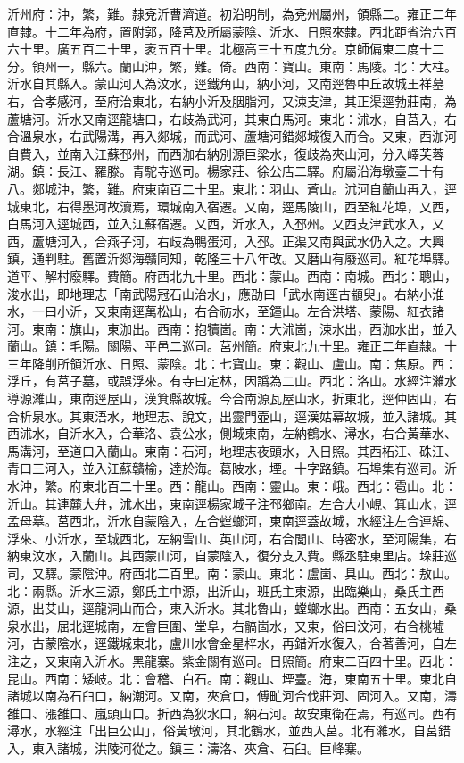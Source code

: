 \begin{pinyinscope}
沂州府：沖，繁，難。隸兗沂曹濟道。初沿明制，為兗州屬州，領縣二。雍正二年直隸。十二年為府，置附郭，降莒及所屬蒙陰、沂水、日照來隸。西北距省治六百六十里。廣五百二十里，袤五百十里。北極高三十五度九分。京師偏東二度十二分。領州一，縣六。蘭山沖，繁，難。倚。西南：寶山。東南：馬陵。北：大柱。沂水自其縣入。蒙山河入為汶水，逕鐵角山，納小河，又南逕魯中丘故城王祥墓右，合孝感河，至府治東北，右納小沂及胭脂河，又涑支津，其正渠逕勃莊南，為蘆塘河。沂水又南逕龍塘口，右歧為武河，其東白馬河。東北：沭水，自莒入，右合溫泉水，右武陽溝，再入郯城，而武河、蘆塘河錯郯城復入而合。又東，西泇河自費入，並南入江蘇邳州，而西泇右納別源巨梁水，復歧為夾山河，分入嶧芙蓉湖。鎮：長江、羅滕。青駝寺巡司。楊家莊、徐公店二驛。府屬沿海墩臺二十有八。郯城沖，繁，難。府東南百二十里。東北：羽山、蒼山。沭河自蘭山再入，逕城東北，右得墨河故瀆焉，環城南入宿遷。又南，逕馬陵山，西至紅花埠，又西，白馬河入逕城西，並入江蘇宿遷。又西，沂水入，入邳州。又西支津武水入，又西，蘆塘河入，合燕子河，右歧為鴨蛋河，入邳。正渠又南與武水仍入之。大興鎮，通判駐。舊置沂郯海贛同知，乾隆三十八年改。又磨山有廢巡司。紅花埠驛。道平、解村廢驛。費簡。府西北九十里。西北：蒙山。西南：南城。西北：聰山，浚水出，即地理志「南武陽冠石山治水」，應劭曰「武水南逕古顓臾」。右納小淮水，一曰小沂，又東南逕萬松山，右合祊水，至鐘山。左合洪塔、蒙陽、紅衣諸河。東南：旗山，東泇出。西南：抱犢崮。南：大沭崮，涑水出，西泇水出，並入蘭山。鎮：毛陽。關陽、平邑二巡司。莒州簡。府東北九十里。雍正二年直隸。十三年降削所領沂水、日照、蒙陰。北：七寶山。東：觀山、盧山。南：焦原。西：浮丘，有莒子墓，或誤浮來。有寺曰定林，因譌為二山。西北：洛山。水經注濰水導源濰山，東南逕屋山，漢箕縣故城。今合南源瓦屋山水，折東北，逕仲固山，右合析泉水。其東浯水，地理志、說文，出靈門壺山，逕漢姑幕故城，並入諸城。其西沭水，自沂水入，合華洛、袁公水，側城東南，左納鶴水、潯水，右合黃華水、馬溝河，至道口入蘭山。東南：石河，地理志夜頭水，入日照。其西柘汪、硃汪、青口三河入，並入江蘇贛榆，達於海。葛陂水，堙。十字路鎮。石埠集有巡司。沂水沖，繁。府東北百二十里。西：龍山。西南：靈山。東：峨。西北：雹山。北：沂山。其連麓大弁，沭水出，東南逕楊家城子注邳鄉南。左合大小峴、箕山水，逕孟母墓。莒西北，沂水自蒙陰入，左合螳螂河，東南逕蓋故城，水經注左合連綿、浮來、小沂水，至城西北，左納雪山、英山河，右合閭山、時密水，至河陽集，右納東汶水，入蘭山。其西蒙山河，自蒙陰入，復分支入費。縣丞駐東里店。垛莊巡司，又驛。蒙陰沖。府西北二百里。南：蒙山。東北：盧崮、具山。西北：敖山。北：兩縣。沂水三源，鄭氏主中源，出沂山，班氏主東源，出臨樂山，桑氏主西源，出艾山，逕龍洞山而合，東入沂水。其北魯山，螳螂水出。西南：五女山，桑泉水出，屈北逕城南，左會巨圍、堂阜，右髇崮水，又東，俗曰汶河，右合桃墟河，古蒙陰水，逕鐵城東北，盧川水會金星梓水，再錯沂水復入，合著善河，自左注之，又東南入沂水。黑龍寨。紫金關有巡司。日照簡。府東二百四十里。西北：昆山。西南：矮岐。北：會稽、白石。南：觀山、堙臺。海，東南五十里。東北自諸城以南為石臼口，納潮河。又南，夾倉口，傅甿河合伐莊河、固河入。又南，濤雒口、漲雒口、嵐頭山口。折西為狄水口，納石河。故安東衛在焉，有巡司。西有潯水，水經注「出巨公山」，俗黃墩河，其北鶴水，並西入莒。北有濰水，自莒錯入，東入諸城，洪陵河從之。鎮三：濤洛、夾倉、石臼。巨峰寨。


\end{pinyinscope}
